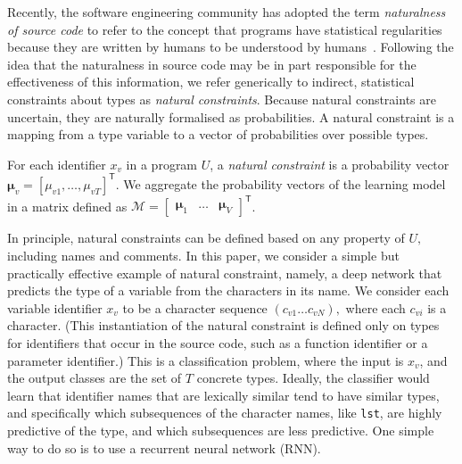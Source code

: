 \documentclass[acmsmall, review, anonymous]{acmart}\settopmatter{printfolios=true,printccs=false,printacmref=false}
\begin{document}
Recently, the software engineering
community has adopted the term \emph{naturalness of source code} to refer to
the concept that programs have statistical regularities because
they are written by humans to be
understood by humans~\citep{hindle12}.
Following the idea that the naturalness in source code may be in part responsible
for the effectiveness of this information, we
refer generically to indirect, statistical
constraints about types as \emph{natural constraints}.
Because natural constraints are uncertain, they are naturally formalised
as probabilities.
A natural constraint is a mapping from a type variable to a vector
of probabilities
over possible types.
\begin{definition}\label{eq:natural}
	For each identifier $x_v$ in a program $U$,
	a \emph{natural constraint} is a probability vector $\bm{\mu}_v = [\mu_{v1}, \ldots, \mu_{vT}]^\mathsf{T}$.
	We aggregate the probability vectors of the learning model in a matrix
	defined as $\mathcal{M} = \begin{bmatrix} \bm{\mu}_1 & \ldots & \bm{\mu}_{V} \end{bmatrix}^\mathsf{T}$.
\end{definition}

In principle, natural constraints can be defined based on any property of $U,$
including names and comments.
In this paper, we consider a simple but practically effective example of
natural constraint, namely, a deep network that predicts the type
of a variable from the characters in its name.
We consider each variable identifier $x_v$ to be a character sequence $(c_{v1} \ldots c_{vN}),$
where each $c_{vi}$ is a character.
(This instantiation of the natural constraint is defined
only on types for identifiers that occur in the source code,
such as a function identifier or a parameter identifier.)
This is a classification problem, where the input is $x_v$,
and the output classes are the set of $T$ concrete types.
Ideally, the classifier would learn that identifier names that are lexically similar
tend to have similar types, and specifically which subsequences of the character names,
like \texttt{lst}, are highly predictive of the type, and which subsequences are less predictive.
One simple way to do so is to use a recurrent neural network (RNN).
\end{document}
